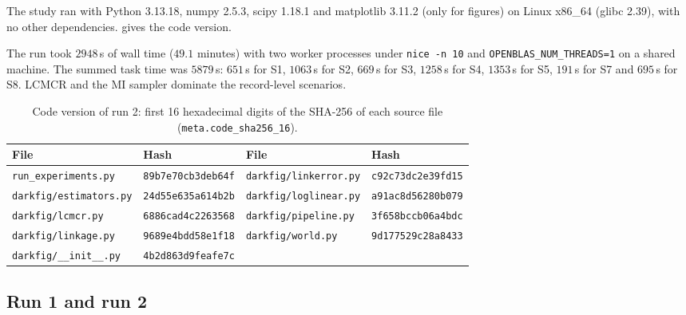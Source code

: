 The study ran with Python 3.13.18, numpy 2.5.3, scipy 1.18.1 and matplotlib 3.11.2 (only for figures) on Linux x86\_64 (glibc 2.39), with no other dependencies.  gives the code version.

The run took $2948$\,s of wall time ($49.1$ minutes) with two worker processes under \texttt{nice -n 10} and \texttt{OPENBLAS\_NUM\_THREADS=1} on a shared machine. The summed task time was $5879$\,s: $651$\,s for S1, $1063$\,s for S2, $669$\,s for S3, $1258$\,s for S4, $1353$\,s for S5, $191$\,s for S7 and $695$\,s for S8. LCMCR and the MI sampler dominate the record-level scenarios.

\begin{table}[tp]
\centering
\caption{Code version of run 2: first 16 hexadecimal digits of the SHA-256 of each source file (\texttt{meta.code\_sha256\_16}).}\label{tab:sim-hashes}
\small
\begin{tabular}{@{}ll@{\qquad}ll@{}}
\toprule
File & Hash & File & Hash \\
\midrule
\texttt{run\_experiments.py} & \texttt{89b7e70cb3deb64f} & \texttt{darkfig/linkerror.py} & \texttt{c92c73dc2e39fd15} \\
\texttt{darkfig/estimators.py} & \texttt{24d55e635a614b2b} & \texttt{darkfig/loglinear.py} & \texttt{a91ac8d56280b079} \\
\texttt{darkfig/lcmcr.py} & \texttt{6886cad4c2263568} & \texttt{darkfig/pipeline.py} & \texttt{3f658bccb06a4bdc} \\
\texttt{darkfig/linkage.py} & \texttt{9689e4bdd58e1f18} & \texttt{darkfig/world.py} & \texttt{9d177529c28a8433} \\
\texttt{darkfig/\_\_init\_\_.py} & \texttt{4b2d863d9feafe7c} & & \\
\bottomrule
\end{tabular}
\end{table}

\subsection{Run 1 and run 2}\label{app:sim-runs}

